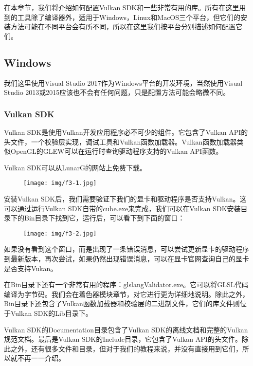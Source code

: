 \documentclass{ctexart}
\begin{document}
在本章节，我们将介绍如何配置Vulkan SDK和一些非常有用的库。所有在这里用到的工具除了编译器外，适用于Windows，Linux和MacOS三个平台，但它们的安装方法可能在不同平台会有所不同，所以在这里我们按平台分别描述如何配置它们。

\subsection{Windows}

我们这里使用Visual Studio 2017作为Windows平台的开发环境，当然使用Visual Studio 2013或2015应该也不会有任何问题，只是配置方法可能会略微不同。

\subsubsection{Vulkan SDK}

Vulkan SDK是使用Vulkan开发应用程序必不可少的组件。它包含了Vulkan API的头文件，一个校验层实现，调试工具和Vulkan函数加载器。Vulkan函数加载器类似OpenGL的GLEW可以在运行时查询驱动程序支持的Vulkan API函数。

Vulkan SDK可以从LunarG的网站上免费下载。

\begin{figure}[H]
	\centering
	\texttt{[image: img/f3-1.jpg]}
\end{figure}

安装Vulkan SDK后，我们需要验证下我们的显卡和驱动程序是否支持Vulkan。这可以通过运行Vulkan SDK自带的cube.exe来完成，我们可以在Vulkan SDK安装目录下的Bin目录下找到它，运行后，可以看下到下面的窗口：

\begin{figure}[H]
	\centering
	\texttt{[image: img/f3-2.jpg]}
\end{figure}

如果没有看到这个窗口，而是出现了一条错误消息，可以尝试更新显卡的驱动程序到最新版本，再次尝试，如果仍然出现错误消息，可以在显卡官网查询自己的显卡是否支持Vukan。

在Bin目录下还有一个非常有用的程序：glslangValidator.exe。它可以将GLSL代码编译为字节码。我们会在着色器模块章节，对它进行更为详细地说明。除此之外，Bin目录下还包含了Vulkan函数加载器和校验层的二进制文件，它们的库文件则位于Vulkan SDK的Lib目录下。

Vulkan SDK的Documentation目录包含了Vulkan SDK的离线文档和完整的Vulkan规范文档。最后是Vulkan SDK的Include目录，它包含了Vulkan API的头文件。除此之外，还有很多文件和目录，但对于我们的教程来说，并没有直接用到它们，所以就不再一一介绍。
\end{document}
